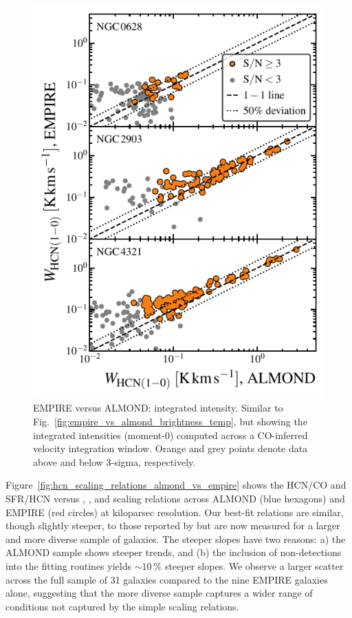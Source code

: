 \documentclass[letter, longauth]{aa} %
\begin{document}
\begin{appendix}
\begin{figure}
\centering
\includegraphics[width=\columnwidth]{Figures/ALMOND_vs_EMPIRE_integrated_intensities_compressed.pdf}
\caption{EMPIRE versus ALMOND: \hcnone integrated intensity.
Similar to Fig.~\ref{fig:empire_vs_almond_brightness_temp}, but showing the integrated intensities (moment-0) computed across a CO-inferred velocity integration window.
Orange and grey points denote data above and below 3-sigma, respectively.
}
\label{fig:empire_vs_almond_intensity}
\end{figure}


Figure~\ref{fig:hcn_scaling_relations_almond_vs_empire} shows the HCN/CO and SFR/HCN versus \sigstar, \sigmol, and \pde scaling relations across ALMOND (blue hexagons) and EMPIRE (red circles) at kiloparsec resolution.
Our best-fit relations are similar, though slightly steeper, to those reported by \citet{Jimenez-Donaire2019} but are now measured for a larger and more diverse sample of galaxies. The steeper slopes have two reasons: a) the ALMOND sample shows steeper trends, and (b) the inclusion of non-detections into the fitting routines yields $\sim\SI{10}{\percent}$ steeper slopes. We observe a larger scatter across the full sample of 31 galaxies compared to the nine EMPIRE galaxies alone, suggesting that the more diverse sample captures a wider range of conditions not captured by the simple scaling relations.


\end{appendix}
\end{document}
